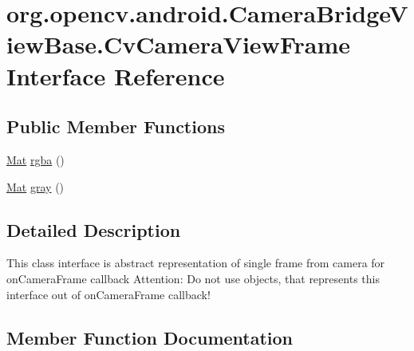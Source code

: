 \hypertarget{interfaceorg_1_1opencv_1_1android_1_1_camera_bridge_view_base_1_1_cv_camera_view_frame}{}\section{org.\+opencv.\+android.\+Camera\+Bridge\+View\+Base.\+Cv\+Camera\+View\+Frame Interface Reference}
\label{interfaceorg_1_1opencv_1_1android_1_1_camera_bridge_view_base_1_1_cv_camera_view_frame}
\subsection*{Public Member Functions}
\begin{DoxyCompactItemize}
\item 
\mbox{\hyperlink{classorg_1_1opencv_1_1core_1_1_mat}{Mat}} \mbox{\hyperlink{interfaceorg_1_1opencv_1_1android_1_1_camera_bridge_view_base_1_1_cv_camera_view_frame_ac668abbfa56c675ada3933e574b153d9}{rgba}} ()
\item 
\mbox{\hyperlink{classorg_1_1opencv_1_1core_1_1_mat}{Mat}} \mbox{\hyperlink{interfaceorg_1_1opencv_1_1android_1_1_camera_bridge_view_base_1_1_cv_camera_view_frame_a0e387c9bcdbcd1327343a2be9094b9a8}{gray}} ()
\end{DoxyCompactItemize}


\subsection{Detailed Description}
This class interface is abstract representation of single frame from camera for on\+Camera\+Frame callback Attention\+: Do not use objects, that represents this interface out of on\+Camera\+Frame callback! 

\subsection{Member Function Documentation}
\mbox{\label{interfaceorg_1_1opencv_1_1android_1_1_camera_bridge_view_base_1_1_cv_camera_view_frame_a0e387c9bcdbcd1327343a2be9094b9a8}} 

